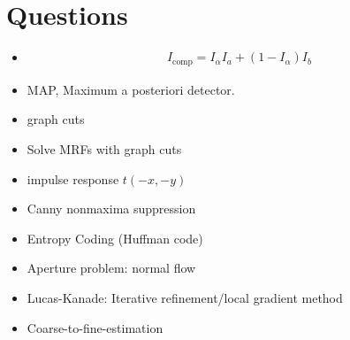 \newpage
\chapter{Questions}
\begin{itemize}[leftmargin=2em]
	\item 
	\begin{gather*}
		I_{\text{comp}}=I_{\alpha}I_{a}+\left( 1-I_{\alpha} \right)I_b
	\end{gather*}
	\item MAP, Maximum a posteriori detector.
	\item graph cuts
	\item Solve MRFs with graph cuts
	\item impulse response $t(-x,-y)$
	\item Canny nonmaxima suppression
	\item Entropy Coding (Huffman code)
	\item Aperture problem: normal flow
	\item Lucas-Kanade: Iterative refinement/local gradient method
	\item Coarse-to-fine-estimation
\end{itemize}
\vfill
